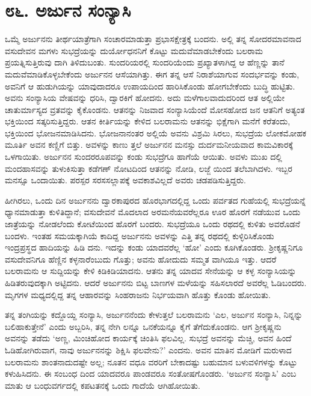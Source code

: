 
\chapter{೮೬. ಅರ್ಜುನ ಸಂನ್ಯಾಸಿ}

ಒಮ್ಮೆ ಅರ್ಜುನನು ತೀರ್ಥಯಾತ್ರೆಗಾಗಿ ಸಂಚಾರಮಾಡುತ್ತಾ ಪ್ರಭಾಸಕ್ಷೇತ್ರಕ್ಕೆ ಬಂದನು. ಅಲ್ಲಿ ತನ್ನ ಸೋದರಮಾವನಾದ ವಸುದೇವನ ಮಗಳು ಸುಭದ್ರೆಯನ್ನು ದುರ್ಯೋಧನನಿಗೆ ಕೊಟ್ಟು ಮದುವೆಮಾಡಬೇಕೆಂದು ಬಲರಾಮ ಪ್ರಯತ್ನಿಸುತ್ತಿರುವು ದಾಗಿ ತಿಳಿದುಬಂತು. ಸುಂದರಿಯರಲ್ಲಿ ಸುಂದರಿಯೆಂದು ಪ್ರಖ್ಯಾತಳಾಗಿದ್ದ ಆ ಹೆಣ್ಣನ್ನು ತಾನೆ ಮದುವೆಮಾಡಿಕೊಳ್ಳಬೇಕೆಂದು ಅರ್ಜುನನ ಆಸೆಯಾಗಿತ್ತು. ಈಗ ತನ್ನ ಆಸೆ ನಿರಾಶೆಯಾಗುವ ಸಂದರ್ಭವನ್ನು ಕಂಡು, ಅವನಿಗೆ ಆ ಹುಡುಗಿಯನ್ನು ಯಾವುದಾದರೂ ಉಪಾಯದಿಂದ ಹಾರಿಸಿಕೊಂಡು ಹೋಗಬೇಕೆಂದು ಬುದ್ಧಿ ಹುಟ್ಟಿತು. ಅವನು ಸಂನ್ಯಾಸಿಯ ವೇಷವನ್ನು ಧರಿಸಿ, ದ್ವಾರಕಿಗೆ ಹೋದನು. ಅದು ಮಳೆಗಾಲವಾದುದರಿಂದ ಆತ ಅಲ್ಲಿಯೇ ಚಾತುರ್ಮಾಸ್ಯದ ವ್ರತವನ್ನು ಕೈಕೊಂಡನು. ಆತನನ್ನು ನಿಜವಾದ ಸಂನ್ಯಾಸಿಯೆಂದೆ ಮೋಸಹೋದ ಜನ ಆತನಿಗೆ ಅತ್ಯಂತ ಭಕ್ತಿಯಿಂದ ಸತ್ಕರಿಸುತ್ತಿದ್ದರು. ಆತನ ಕೀರ್ತಿಯನ್ನು ಕೇಳಿದ ಬಲರಾಮನು ಆತನನ್ನು ಭಿಕ್ಷೆಗಾಗಿ ಮನೆಗೆ ಕರೆತಂದು, ಭಕ್ತಿಯಿಂದ ಭೋಜನಮಾಡಿಸಿದನು. ಭೋಜನಾನಂತರ ಅಲ್ಲಿಯೆ ಅವನು ವಿಶ್ರಮಿ ಸಿರಲು, ಸುಭದ್ರೆಯ ಲೋಕಮೋಹಕ ಮೂರ್ತಿ ಅವನ ಕಣ್ಣಿಗೆ ಬಿತ್ತು. ಅವಳನ್ನು ಕಾಣು ತ್ತಲೆ ಅರ್ಜುನನ ಮನಸ್ಸು ದುರ್ದಮನೀಯವಾದ ಕಾಮವಿಕಾರಕ್ಕೆ ಒಳಗಾಯಿತು. ಅರ್ಜುನನ ಸುಂದರರೂಪವನ್ನು ಕಂಡು ಸುಭದ್ರೆಗೂ ಹಾಗೆಯೆ ಆಯಿತು. ಅವಳು ಮುಖ ದಲ್ಲಿ ಮಂದಹಾಸವನ್ನು ತುಳುಕಿಸುತ್ತಾ ಕಡೆಗಣ್ ನೋಟದಿಂದ ಆತನನ್ನು ನೋಡಿ, ಲಜ್ಜೆ ಯಿಂದ ತಲೆಬಾಗಿದಳು. ಇಬ್ಬರ ಮನಸ್ಸೂ ಒಂದಾಯಿತು. ಪರಸ್ಪರ ಸರಸಸಲ್ಲಾಪಕ್ಕೆ ಅವಕಾಶವಿಲ್ಲದೆ ಅವರು ಚಡಪಡಿಸುತ್ತಿದ್ದರು.

ಹೀಗಿರಲು, ಒಂದು ದಿನ ಅರ್ಜುನನು ದ್ವಾರಕಾಪುರದ ಹೊರಭಾಗದಲ್ಲಿದ್ದ ಒಂದು ಪರ್ವತದ ಗುಹೆಯಲ್ಲಿ ಸುಭದ್ರೆಯನ್ನೆ ಧ್ಯಾನಮಾಡುತ್ತಾ ಕುಳಿತಿದ್ದಾನೆ; ವಸುದೇವನೆ ಮೊದಲಾದ ಅರಮನೆಯವರೆಲ್ಲರೂ ಊರ ಹೊರಗೆ ನಡೆಯುವ ಒಂದು ಜಾತ್ರೆಯನ್ನು ನೋಡಲೆಂದು ಕೋಟೆಯಿಂದ ಹೊರಗೆ ಬಂದರು. ಸುಭದ್ರೆಯೂ ಒಂದು ರಥದಲ್ಲಿ ಕುಳಿತು ಅವರೊಡನೆ ಬಂದಳು. ಇಂತಹ ಸಮಯಕ್ಕಾಗಿಯೆ ಕಾದಿದ್ದ ಅರ್ಜುನನು ಅವಳನ್ನು ಎತ್ತಿ ತನ್ನ ರಥದಲ್ಲಿ ಕುಳ್ಳಿರಿಸಿಕೊಂಡು ಇಂದ್ರಪ್ರಸ್ಥದ ಹಾದಿಯನ್ನು ಹಿಡಿ ದನು. ಇದನ್ನು ಕಂಡು ಯಾದವರೆಲ್ಲ ‘ಹೋ’ ಎಂದು ಕೂಗಿಕೊಂಡರು. ಶ್ರೀಕೃಷ್ಣನಿಗೂ ವಸುದೇವನಿಗೂ ಹೆಣ್ಣಿನ ಕಳ್ಳನಾರೆಂಬುದು ಗೊತ್ತು; ಅವನು ಹೋದುದು ಸಮ್ಮತ ವಾಗಿಯೂ ಇತ್ತು. ಆದರೆ ಬಲರಾಮನು ಆ ಸುದ್ದಿಯನ್ನು ಕೇಳಿ ಕಿಡಿಕಿಡಿಯಾದನು. ಆತನು ತನ್ನ ಯಾದವ ಸೇನೆಯನ್ನು ಆ ಕಳ್ಳ ಸಂನ್ಯಾಸಿಯನ್ನು ಹಿಡಿತರುವುದಕ್ಕಾಗಿ ಅಟ್ಟಿದನು. ಆದರೆ ಅರ್ಜುನನು ಬಿಟ್ಟ ಬಾಣಗಳ ಮಳೆಯನ್ನು ಸಹಿಸಲಾರದೆ ಅವರೆಲ್ಲ ಓಡಿಬಂದರು. ಮೃಗಗಳ ಮಧ್ಯದಲ್ಲಿದ್ದ ತನ್ನ ಆಹಾರವನ್ನು ಸಿಂಹರಾಜನು ನಿರ್ಭಯವಾಗಿ ಹೊತ್ತು ಕೊಂಡು ಹೋಯಿತು.

ತನ್ನ ತಂಗಿಯನ್ನು ಕದ್ದೊಯ್ದ ಸಂನ್ಯಾಸಿ, ಅರ್ಜುನನೆಂದು ಕೇಳುತ್ತಲೆ ಬಲರಾಮನು ‘ಎಲ, ಅರ್ಜುನ ಸಂನ್ಯಾಸಿ, ನಿನ್ನನ್ನು ಬಲಿಹಾಕುತ್ತೇನೆ’ ಎಂದು ಅಬ್ಬರಿಸಿ, ತನ್ನ ನೇಗಿ ಲನ್ನೂ ಒನಕೆಯನ್ನೂ ಕೈಗೆ ತೆಗೆದುಕೊಂಡನು. ಆಗ ಶ್ರೀಕೃಷ್ಣನು ಅವನನ್ನು ತಡೆದು ‘ಅಣ್ಣ, ಮಿಂಚಿಹೋದ ಕಾರ್ಯಕ್ಕೆ ಚಿಂತಿಸಿ ಫಲವಿಲ್ಲ. ಸುಭದ್ರೆ ಅವನನ್ನು ಮೆಚ್ಚಿ, ಅವನ ಹಿಂದೆ ಓಡಿಹೋಗಿರುವಾಗ, ನಾವು ಅರ್ಜುನನನ್ನು ಶಿಕ್ಷಿಸಿ ಫಲವೇನು?’ ಎಂದನು. ಅವನ ಮಾತಿನ ಮೋಡಿಗೆ ಮರುಳಾದ ಬಲರಾಮನು ಶಾಂತನಾದುದಷ್ಟೇ ಅಲ್ಲ; ನೂತನ ವಧೂ ವರರಿಗೆ ಬೇಕಾದಷ್ಟು ಬಹುಮಾನ ಬಳುವಳಿಗಳನ್ನು ಕೊಟ್ಟು ಕಳುಹಿಸಿದನು. ಈ ಸಂಬಂಧ ದಿಂದ ಯಾದವರೂ ಪಾಂಡವರೂ ಸಂತೋಷಗೊಂಡರು. ‘ಅರ್ಜುನ ಸಂನ್ಯಾಸಿ’ ಎಂಬ ಮಾತು ಆ ಬಂಧುವರ್ಗದಲ್ಲಿ ಕಪಟತನಕ್ಕೆ ಒಂದು ಗಾದೆಯೆ ಆಗಿಹೋಯಿತು.

